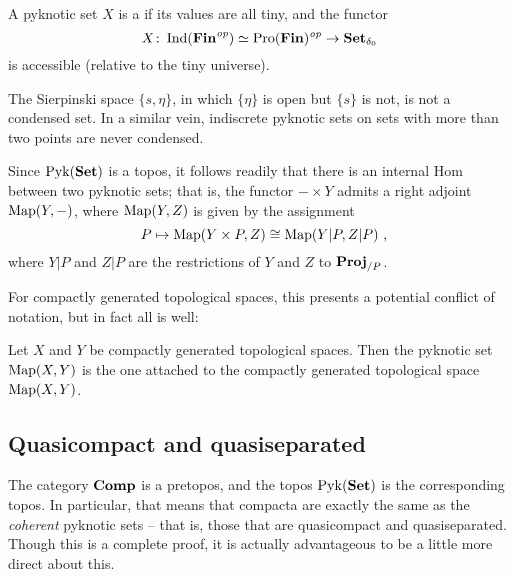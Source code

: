 \begin{dfn}
	A pyknotic set $ X $ is a  if its values are all tiny, and the functor
	\[
		X \colon \operatorname{Ind}(\textbf{\textup{Fin}}^{\textit{op}}) \simeq \operatorname{Pro}(\textbf{\textup{Fin}})^{\textit{op}} \to \textbf{\textup{Set}}_{\delta_0}
	\]
	is accessible (relative to the tiny universe).
\end{dfn}

\begin{exm}
	The Sierpinski space $ \{s, \eta \} $, in which $ \{\eta\} $ is open but $ \{ s \} $ is not, is not a condensed set.
	In a similar vein, indiscrete pyknotic sets on sets with more than two points are never condensed.
\end{exm}

\begin{cnstr}
	Since $ \operatorname{Pyk} (\textbf{\textup{Set}}) $ is a topos, it follows readily that there is an internal Hom between two pyknotic sets;
	that is, the functor $ - \times Y $ admits a right adjoint $ \operatorname{Map}( Y, - ) $, where $ \operatorname{Map}(Y, Z) $ is given by the assignment
	\[
		P \mapsto \Map(Y \times P, Z) \cong \Map(Y|P, Z|P) \comma
	\]
	where $ Y|P $ and $ Z|P $ are the restrictions of $ Y $ and $ Z $ to $ \textbf{\textup{Proj}}_{/P} $.
\end{cnstr}

For compactly generated topological spaces, this presents a potential conflict of notation, but in fact all is well:
\begin{prp}
	Let $ X $ and $ Y $ be compactly generated topological spaces.
	Then the pyknotic set $ \operatorname{Map}(X, Y) $ is the one attached to the compactly generated topological space $ \operatorname{Map}(X, Y) $.
\end{prp}

\subsection{Quasicompact and quasiseparated}

\begin{nul}
	The category $ \textbf{\textup{Comp}} $ is a pretopos, and the topos $ \operatorname{Pyk}(\textbf{\textup{Set}}) $ is the corresponding topos.
	In particular, that means that compacta are exactly the same as the \emph{coherent} pyknotic sets -- that is, those that are quasicompact and quasiseparated.
	Though this is a complete proof, it is actually advantageous to be a little more direct about this.
\end{nul}

